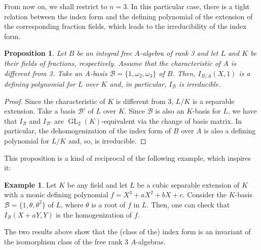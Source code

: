 \documentclass[oneside]{amsart}
\DeclareMathOperator{\gl}{GL}
\newtheorem{proposition}[X]{Proposition}
\theoremstyle{definition}
\newtheorem{example}[X]{Example}
\begin{document}
From now on, we shall restrict to $n = 3$. In this particular case, there is a tight relation between the index form and the defining polynomial of the extension of the corresponding fraction fields, which leads to the irreducibility of the index form.

\begin{proposition}
    \label{proposition: irreducibility of index form}
    Let $B$ be an integral free $A$-algebra of rank 3 and let $L$ and $K$ be their fields of fractions, respectively. Assume that the characteristic of $A$ is different from 3. Take an $A$-basis $\mathcal{B} = \{1,\omega_2,\omega_3\}$ of $B$. Then, $I_{B/A}(X,1)$ is a defining polynomial for $L$ over $K$ and, in particular, $I_{\mathcal{B}}$ is irreducible.
\end{proposition}
\begin{proof}
    Since the characteristic of $K$ is different from 3, $L/K$ is a separable extension. Take a basis $\mathcal{B}'$ of $L$ over $K$. Since $\mathcal{B}$ is also an $K$-basis for $L$, we have that $I_{\mathcal{B}}$ and $I_{\mathcal{B}'}$ are $\gl_2(K)$-equivalent via the change of basis matrix. In particular, the dehomogenization of the index form of $B$ over $A$ is also a defining polynomial for $L/K$ and, so, is irreducible.
\end{proof}

This proposition is a kind of reciprocal of the following example, which inspires it: 

\begin{example}
    Let $K$ be any field and let $L$ be a cubic separable extension of $K$ with a monic defining polynomial $f = X^3 + aX^2 + bX + c$. Consider the $K$-basis $\mathcal{B} = \{1,\theta,\theta^2\}$ of $L$, where $\theta$ is a root of $f$ in $L$. Then, one can check that $I_{\mathcal{B}}(X + aY,Y)$ is the homogenization of $f$.
\end{example}

The two  results above show that the (class of the) index form is an invariant of the isomorphism class of the free rank 3 $A$-algebras. 
\end{document}
